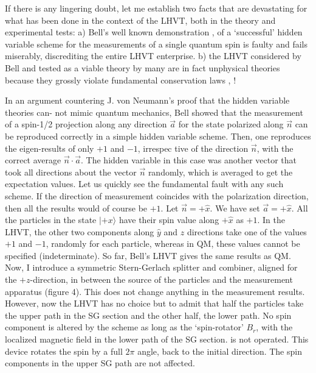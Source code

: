 If there is any lingering doubt, let me establish two facts that are devastating for what
has been done in the context of the LHVT, both in the theory and experimental tests: a)
Bell's well known demonstration \cite{chap27-key12}, \cite{chap27-key13} of a `successful' hidden variable scheme for the
measurements of a single quantum spin is faulty and fails miserably, discrediting the entire
LHVT enterprise. b) the LHVT considered by Bell and tested as a viable theory by many
are in fact unphysical theories because they grossly violate fundamental conservation laws
\cite{chap27-key14}, \cite{chap27-key15}!

In an argument countering J. von Neumann's proof that the hidden variable theories can-
not mimic quantum mechanics, Bell showed that the measurement of a spin-1/2 projection
along any direction $\vec{a}$ for the state polarized along $\vec{n}$ can be reproduced correctly in a simple
hidden variable scheme. Then, one reproduces the eigen-results of only $+1$ and $-1$, irrespec
tive of the direction $\vec{n}$, with the correct average $\vec{n} \cdot \vec{a}$.
 The hidden variable in this case was another vector that took all directions about the vector $\vec{n}$ randomly, which is averaged to
get the expectation values. Let us quickly see the fundamental fault with any such scheme.
If the direction of measurement coincides with the polarization direction, then all the results
would of course be $+1$. Let $\vec{n} = + \hat{x}$. We have set $\vec{a} = + \hat{x}$. All the particles in the state
$|+x \rangle $ have their spin value along $+ \hat{x}$ as $+1$. In the LHVT, the other two components along
$\hat{y}$ and $\hat{z}$ directions take one of the values $+1$ and $-1$, randomly for each particle, whereas in
QM, these values cannot be specified (indeterminate). So far, Bell's LHVT gives the same
results as QM. Now, I introduce a symmetric Stern-Gerlach splitter and combiner, aligned
for the $+z$-direction, in between the source of the particles and the measurement apparatus
(figure 4). This does not change anything in the measurement results. However, now the
LHVT has no choice but to admit that half the particles take the upper path in the SG
section and the other half, the lower path. No spin component is altered by the scheme as
long as the `spin-rotator' $B_r$, with the localized magnetic field in the lower path of the SG
section. is not operated. This device rotates the spin by a full $2\pi$ angle, back to the initial
direction. The spin components in the upper SG path are not affected.


